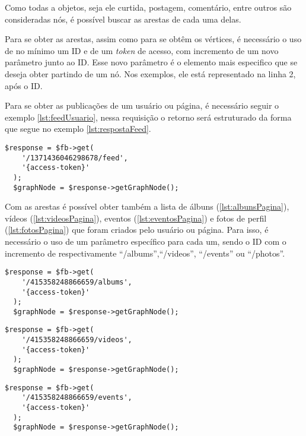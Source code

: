 Como todas a objetos, seja ele curtida, postagem, comentário, entre outros são consideradas nós, é possível buscar as arestas de cada uma delas.

Para se obter as arestas, assim como para se obtêm os vértices, é necessário o uso de no mínimo um ID e de um \textit{token} de acesso, com incremento de um novo parâmetro junto ao ID. Esse novo parâmetro é o elemento mais especifico que se deseja obter partindo de um nó. Nos exemplos, ele está representado na linha 2, após o ID.

Para se obter as publicações de um usuário ou página, é necessário seguir o exemplo \ref{lst:feedUsuario}, nessa requisição o retorno será estruturado da forma que segue no exemplo \ref{lst:respostaFeed}.

\begin{lstlisting}[caption={Requisitando todas as publicações de um usuário},label={lst:feedUsuario}]
  $response = $fb->get( 
    '/1371436046298678/feed', 
    '{access-token}'
  );
  $graphNode = $response->getGraphNode();
\end{lstlisting}

Com as arestas é possível obter também a lista de álbuns (\ref{lst:albunsPagina}), vídeos (\ref{lst:videosPagina}), eventos (\ref{lst:eventosPagina}) e fotos de perfil (\ref{lst:fotosPagina}) que foram criados pelo usuário ou página. Para isso, é necessário o uso de um parâmetro específico para cada um, sendo o ID com o incremento de respectivamente ``/albums'',``/videos'', ``/events'' ou ``/photos''.
\begin{lstlisting}[caption={Requisitar todos os álbuns de uma página},label={lst:albunsPagina}]
  $response = $fb->get( 
    '/415358248866659/albums', 
    '{access-token}'
  );
  $graphNode = $response->getGraphNode();
\end{lstlisting}

\begin{lstlisting}[caption={Requisitar os vídeos publicados na página},label={lst:videosPagina}]
  $response = $fb->get( 
    '/415358248866659/videos', 
    '{access-token}'
  );
  $graphNode = $response->getGraphNode();
\end{lstlisting}

\begin{lstlisting}[caption={Requisitar os eventos agendados pela página},label={lst:eventosPagina}]
  $response = $fb->get( 
    '/415358248866659/events', 
    '{access-token}'
  );
  $graphNode = $response->getGraphNode();
\end{lstlisting}


